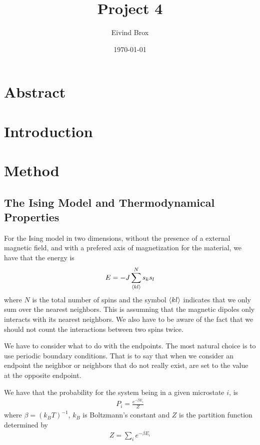 \documentclass[11pt, a4paper]{article}
\author{Eivind Brox}
\title{Project 4}
\date{\today}
\begin{document}
\maketitle
\thispagestyle{empty}
\clearpage	

\section{Abstract}



\clearpage
\pagestyle{headings}		
\tableofcontents		
\clearpage
{}		

\section{Introduction}
\clearpage
\section{Method}
\subsection{The Ising Model and Thermodynamical Properties}
For the Ising model in two dimensions, without the presence of a external magnetic field, and with a prefered axis of magnetization for the material, we have that the energy is
\begin{gather}
E = -J\sum\limits_{\braket{kl}}^N s_ks_l
\label{eq:main_energy}
\end{gather}
where $N$ is the total number of spins and the symbol $\braket{kl}$ indicates that we only sum over the nearest neighbors. This is assumning that the magnetic dipoles only interacts with its nearest neighbors. We also have to be aware of the fact that we should not count the interactions between two spins twice. 

We have to consider what to do with the endpoints. The most natural choice is to use periodic boundary conditions. That is to say that when we consider an endpoint the neighbor or neighbors that do not really exist, are set to the value at the opposite endpoint.

We have that the probability for the system being in a given microstate $i$, is 
\begin{gather}
P_i = \frac{e^{-\beta E_i}}{Z}
\end{gather}
where $\beta=(k_BT)^{-1}$, $k_B$ is Boltzmann's constant and $Z$ is the partition function determined by
\begin{gather}
Z = \sum\limits_i e^{-\beta E_i}
\label{eq:main_partition}
\end{gather}
\end{document}
